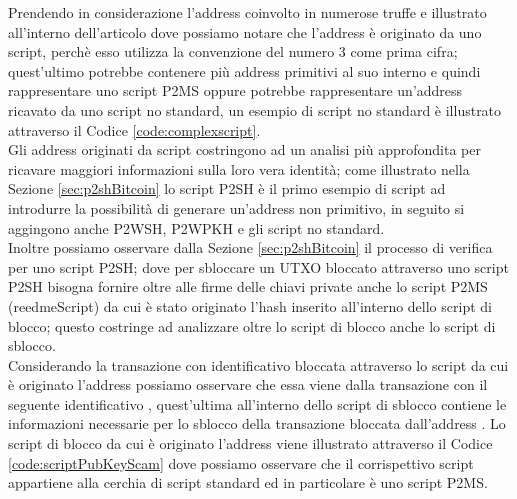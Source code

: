  \begin{example}\label{ex:probleGraphAddress}
   Prendendo in considerazione l'address  coinvolto in numerose truffe e illustrato all'interno dell'articolo \cite{biva:article} dove possiamo notare che l'address è originato da uno script, perchè esso utilizza la convenzione del numero 3 come prima cifra; quest'ultimo potrebbe contenere più address primitivi al suo interno e quindi rappresentare uno script P2MS oppure potrebbe rappresentare un'address ricavato da uno script no standard, un esempio di script no standard è illustrato attraverso il Codice \ref{code:complexscript}.\\
   Gli address originati da script costringono ad un analisi più approfondita per ricavare maggiori informazioni sulla loro vera identità; come illustrato nella Sezione \ref{sec:p2shBitcoin} lo script P2SH è il primo esempio di script ad introdurre la possibilità di generare un'address non primitivo, in seguito si aggingono anche P2WSH, P2WPKH e gli script no standard.\\
   Inoltre possiamo osservare dalla Sezione \ref{sec:p2shBitcoin} il processo di verifica per uno script P2SH; dove per sbloccare un UTXO bloccato attraverso uno script P2SH bisogna fornire oltre alle firme delle chiavi private anche lo script P2MS (reedmeScript) da cui è stato originato l'hash inserito all'interno dello script di blocco; questo costringe ad analizzare oltre lo script di blocco anche lo script di sblocco.\\
   Considerando la transazione con identificativo  bloccata attraverso lo script da cui è originato l'address  possiamo osservare che essa viene  dalla transazione con il seguente identificativo , quest'ultima all'interno dello script di sblocco contiene le informazioni necessarie per lo sblocco della transazione bloccata dall'address .
   Lo script di blocco da cui è originato l'address viene illustrato attraverso il Codice \ref{code:scriptPubKeyScam} dove possiamo osservare che il corrispettivo script appartiene alla cerchia di script standard ed in particolare è uno script P2MS.
   \begin{lstlisting}[language=bitcoinscript, label={code:scriptPubKeyScam}, caption={Script da cui è originato l'address preso in esempio.}]

\end{lstlisting}
\end{example}
